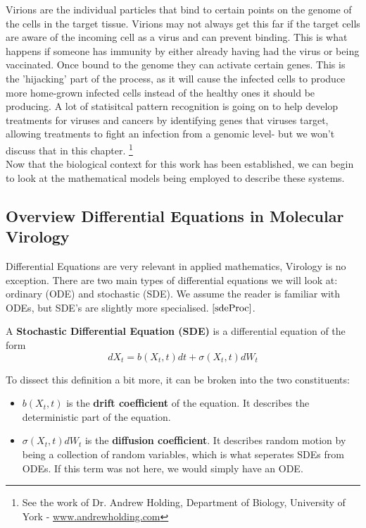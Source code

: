Virions are the individual particles that bind to certain points on the genome of the cells in the target tissue. Virions may not always get this far if the target cells are aware of the incoming cell as a virus and can prevent binding. This is what happens if someone has immunity by either already having had the virus or being vaccinated. Once bound to the genome they can activate certain genes. This is the 'hijacking' part of the process, as it will cause the infected cells to produce more home-grown infected cells instead of the healthy ones it should be producing. A lot of statisitcal pattern recognition is going on to help develop treatments for viruses and cancers by identifying genes that viruses target, allowing treatments to fight an infection from a genomic level- but we won't discuss that in this chapter. \footnote{See the work of Dr. Andrew Holding, Department of Biology, University of York - \url{www.andrewholding.com}} \\

Now that the biological context for this work has been established, we can begin to look at the mathematical models being employed to describe these systems.

\subsection{Overview Differential Equations in Molecular Virology}

Differential Equations are very relevant in applied mathematics, Virology is no exception. There are two main types of differential equations we will look at: ordinary (ODE) and stochastic (SDE). 
We assume the reader is familiar with ODEs, but SDE's are slightly more specialised. $\cite{sdeProc}$.

\begin{definition}
    A \textbf{Stochastic Differential Equation (SDE)} is a differential equation of the form 
    \[
        dX_t = b(X_t,t)dt + \sigma (X_t,t)dW_t
    \]  
\end{definition}

To dissect this definition a bit more, it can be broken into the two constituents:

\begin{itemize}
    \item $b(X_t,t)$ is the \textbf{drift coefficient} of the equation. It describes the deterministic part of the equation. \\
    \item $\sigma (X_t,t)dW_t$ is the \textbf{diffusion coefficient}. It describes random motion by being a collection of random variables, which is what seperates SDEs from ODEs. If this term was not here, we would simply have an ODE.
\end{itemize}

